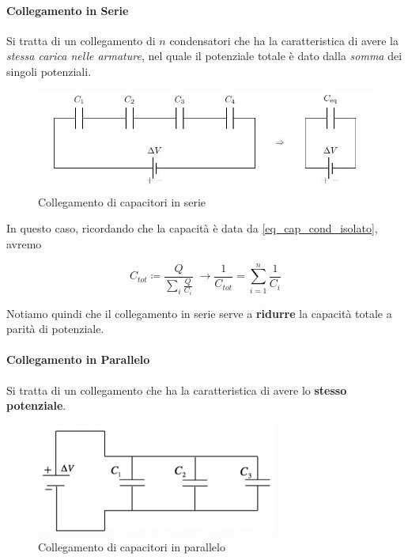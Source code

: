 \paragraph{Collegamento in Serie} Si tratta di un collegamento di $n$ condensatori che ha la caratteristica di avere la \textit{stessa carica nelle armature}, nel quale il potenziale totale è dato dalla \textit{somma} dei singoli potenziali.

\begin{figure}[ht]
	\centering
	\includegraphics[width=0.7\linewidth]{Media/condensatori_serie}
	\caption {Collegamento di capacitori in serie}
	\label{fig:condensatoriserie}
\end{figure}

In questo caso, ricordando che la capacità è data da \ref{eq_cap_cond_isolato}, avremo

\begin{large}
	\begin{equation} \label{eq_cap_serie}
		C_{tot} \coloneqq \frac{Q}{\sum_{i}  \frac{Q}{C_i}} \; \rightarrow \frac{1}{C_{tot}} = \sum_{i=1}^{n} \frac{1}{C_i}
	\end{equation}
\end{large}

Notiamo quindi che il collegamento in serie serve a \textbf{ridurre} la capacità totale a parità di potenziale.


\paragraph{Collegamento in Parallelo}
Si tratta di un collegamento che ha la caratteristica di avere lo \textbf{stesso potenziale}.

\begin{figure}[H]
	\centering
	\includegraphics[width=0.5\linewidth]{Media/condensatoriparallelo}
	\caption{Collegamento di capacitori in parallelo}
	\label{fig:condensatoriparallelo}
\end{figure}


